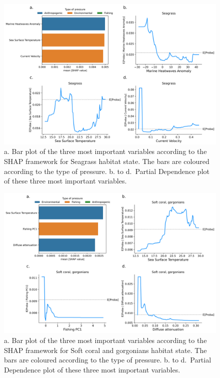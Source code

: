 \begin{figure}
\hypertarget{fig:chap3figS47}{%
\centering
\includegraphics{03-Chapitre3/figures/supplementary/04-pdp_Seagrass.png}
\caption{a. Bar plot of the three most important variables according to
the SHAP framework for Seagrass habitat state. The bars are coloured
according to the type of pressure. b. to d.~Partial Dependence plot of
these three most important variables.}\label{fig:chap3figS47}
}
\end{figure}

\begin{figure}
\hypertarget{fig:chap3figS48}{%
\centering
\includegraphics{03-Chapitre3/figures/supplementary/04-pdp_Soft coral, gorgonians.png}
\caption{a. Bar plot of the three most important variables according to
the SHAP framework for Soft coral and gorgonians habitat state. The bars
are coloured according to the type of pressure. b. to d.~Partial
Dependence plot of these three most important
variables.}\label{fig:chap3figS48}
}
\end{figure}


